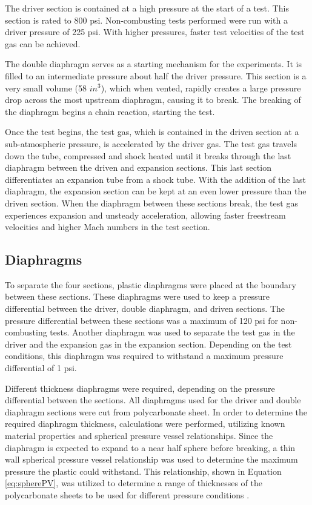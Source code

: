 The driver section is contained at a high pressure at the start of a test. This section is rated to 800 psi. Non-combusting tests performed were run with a driver pressure of 225 psi. With higher pressures, faster test velocities of the test gas can be achieved. 

The double diaphragm serves as a starting mechanism for the experiments. It is filled to an intermediate pressure about half the driver pressure. This section is a very small volume (58 $in^3$), which when vented, rapidly creates a large pressure drop across the most upstream diaphragm, causing it to break. The breaking of the diaphragm begins a chain reaction, starting the test. 

Once the test begins, the test gas, which is contained in the driven section at a sub-atmospheric pressure, is accelerated by the driver gas. The test gas travels down the tube, compressed and shock heated until it breaks through the last diaphragm between the driven and expansion sections. This last section differentiates an expansion tube from a shock tube. With the addition of the last diaphragm, the expansion section can be kept at an even lower pressure than the driven section. When the diaphragm between these sections break, the test gas experiences  expansion and unsteady acceleration, allowing faster freestream velocities and higher Mach numbers in the test section. 


\subsection{Diaphragms}
To separate the four sections, plastic diaphragms were placed at the boundary between these sections. These diaphragms were used to keep a pressure differential between the driver, double diaphragm, and driven sections. The pressure differential between these sections was a maximum of 120 psi for non-combusting tests. Another diaphragm was used to separate the test gas in the driver and the expansion gas in the expansion section. Depending on the test conditions, this diaphragm was required to withstand a maximum pressure differential of 1 psi. 

Different thickness diaphragms were required, depending on the pressure differential between the sections. All diaphragms used for the driver and double diaphragm sections were cut from polycarbonate sheet. In order to determine the required diaphragm thickness, calculations were performed, utilizing known material properties and spherical pressure vessel relationships. Since the diaphragm is expected to expand to a near half sphere before breaking, a thin wall spherical pressure vessel relationship was used to determine the maximum pressure the plastic could withstand. This relationship, shown in Equation \ref{eq:spherePV}, was utilized to determine a range of thicknesses of the polycarbonate sheets to be used for different pressure conditions \cite{hibbelermechanics}. 


